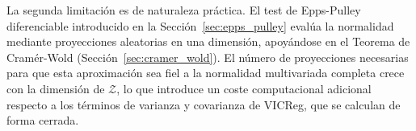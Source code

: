 La segunda limitación es de naturaleza práctica. El test de Epps-Pulley diferenciable introducido en la Sección~\ref{sec:epps_pulley} evalúa la normalidad mediante proyecciones aleatorias en una dimensión, apoyándose en el Teorema de Cramér-Wold (Sección~\ref{sec:cramer_wold}). El número de proyecciones necesarias para que esta aproximación sea fiel a la normalidad multivariada completa crece con la dimensión de $\mathcal{Z}$, lo que introduce un coste computacional adicional respecto a los términos de varianza y covarianza de VICReg, que se calculan de forma cerrada.
